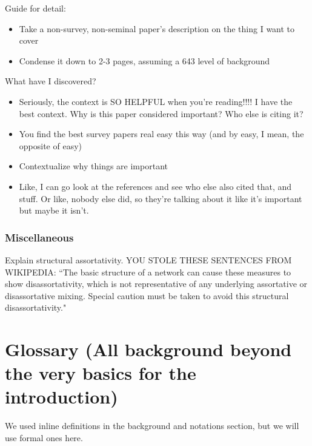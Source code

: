 \documentclass[12pt]{thesis}
\theoremstyle{plain}
\theoremstyle{definition}
\theoremstyle{remark}
\begin{document}
Guide for detail:
\begin{itemize}
\item Take a non-survey, non-seminal paper's description on the thing I want to cover
\item Condense it down to 2-3 pages, assuming a 643 level of background
\end{itemize}

What have I discovered?
\begin{itemize}
\item Seriously, the context is SO HELPFUL when you're reading!!!! I have the best context. Why is this paper considered important? Who else is citing it?
\item You find the best survey papers real easy this way (and by easy, I mean, the opposite of easy)
\item Contextualize why things are important 
\item Like, I can go look at the references and see who else also cited that, and stuff. Or like, nobody else did, so they're talking about it like it's important but maybe it isn't.
\end{itemize}




\subsection{Miscellaneous}

Explain structural assortativity. YOU STOLE THESE SENTENCES FROM WIKIPEDIA: ``The basic structure of a network can cause these measures to show disassortativity, which is not representative of any underlying assortative or disassortative mixing. Special caution must be taken to avoid this structural disassortativity."
















\chapter{Glossary (All background beyond the very basics for the introduction)}
We used inline definitions in the background and notations section, but we will use formal ones here.
\cite{Nobody06}
\end{document}
